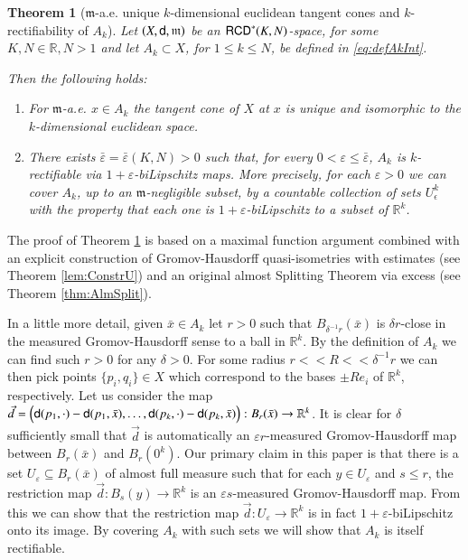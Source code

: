 \documentclass[11pt,reqno]{amsart}
\newcommand{\mm}{\mathfrak m}
\newcommand{\sfd}{{\sf d}}
\newcommand{\R}{\mathbb{R}}
\newcommand{\RCD}{{\sf RCD}}
\newcommand{\vare}{\varepsilon}
\newtheorem{theorem}{Theorem}[section]
\theoremstyle{definition}
\theoremstyle{remark}
\theoremstyle{remark}
\theoremstyle{remark}
\theoremstyle{remark}
\theoremstyle{remark}
\theoremstyle{remark}
\theoremstyle{remark}
\begin{document}
\begin{theorem}[$\mm$-a.e. unique $k$-dimensional euclidean tangent cones and $k$-rectifiability of $A_k$]\label{thm:StructAk}
Let $(X,\sfd, \mm)$ be an $\RCD^*(K,N)$-space, for some $K,N\in \R ,N>1$ and let $A_k\subset X$, for $1\leq k \leq N$, be defined in \eqref{eq:defAkInt}. 

 Then the following holds:
\begin{enumerate}
\item For $\mm$-a.e. $x \in A_k$ the tangent cone of $X$ at $x$ is unique and isomorphic to the $k$-dimensional euclidean space.
\item  There exists $\bar{\vare}=\bar{\vare}(K,N)>0$ such that, for every $0<\vare\leq \bar{\vare}$, $A_k$ is $k$-rectifiable via   $1+\vare$-biLipschitz maps.  More precisely, for each $\vare>0$ we can cover $A_k$, up to an $\mm$-negligible subset, by a countable collection of sets $U^k_{\epsilon}$ with the property that each one is $1+\vare$-biLipschitz to a subset of $\R^k$.
\end{enumerate}
\end{theorem}

The proof of  Theorem \ref{thm:StructAk} is based on a  maximal function argument  combined with an explicit construction of Gromov-Hausdorff quasi-isometries with estimates (see Theorem \ref{lem:ConstrU}) and an original almost Splitting Theorem via  excess (see Theorem \ref{thm:AlmSplit}). 


In a little more detail, given $\bar x\in A_k$ let $r>0$ such that $B_{\delta^{-1}r}(\bar x)$ is $\delta r$-close in the measured Gromov-Hausdorff sense to a ball in $\R^k$.  By the definition of $A_k$ we can find such $r>0$ for any $\delta>0$.  For some radius $r<<R<<\delta^{-1}r$ we can then pick points $\{p_i,q_i\}\in X$ which correspond to the bases $\pm R e_i$ of $\R^k$, respectively.  Let us consider the map $\vec d=\Big(\sfd(p_1,\cdot)-\sfd(p_1, \bar x),\ldots,\sfd(p_k,\cdot)-\sfd(p_k, \bar x)\Big):B_r(\bar x)\to \R^k$.  It is clear for $\delta$ sufficiently small that $\vec d$ is automatically an $\varepsilon r$-measured Gromov-Hausdorff map between $B_r(\bar x)$ and $B_r(0^k)$.  Our primary claim in this paper is that there is a set $U_\varepsilon\subseteq B_r(\bar x)$ of almost full measure such that for each $y\in U_\varepsilon$ and $s\leq r$, the restriction map $\vec d:B_{s}(y)\to\R^k$ is an $\varepsilon s$-measured Gromov-Hausdorff map.  From this we can show that the restriction map $\vec d:U_\varepsilon\to \R^k$ is in fact $1+\varepsilon$-biLipschitz onto its image.  By covering $A_k$ with such sets we will show that $A_k$ is itself rectifiable.
\end{document}
